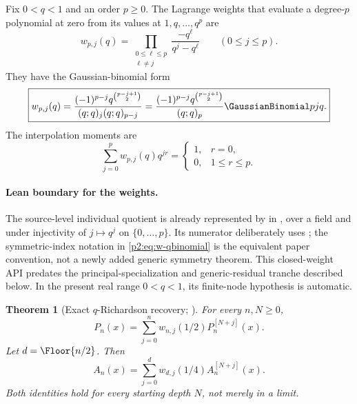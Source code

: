 \documentclass[11pt,oneside]{article}
\numberwithin{equation}{section}
\newtheorem{theorem}{Theorem}[section]
\theoremstyle{definition}
\theoremstyle{remark}
\begin{document}
Fix $0<q<1$ and an order $p\ge0$.  The Lagrange weights that evaluate a degree-$p$ polynomial at
zero from its values at $1,q,\ldots,q^p$ are
\begin{equation}
 w_{p,j}(q)
 =\prod_{\substack{0\le\ell\le p\\\ell\ne j}}
 \frac{-q^\ell}{q^j-q^\ell}
 \qquad(0\le j\le p).
 \label{p2:eq:w-Lagrange}
\end{equation}
They have the Gaussian-binomial form
\begin{equation}
 \boxed{
 w_{p,j}(q)
 =\frac{(-1)^{p-j}q^{\binom{p-j+1}{2}}}
 {(q;q)_j(q;q)_{p-j}}
 =\frac{(-1)^{p-j}q^{\binom{p-j+1}{2}}}{(q;q)_p}
 \GaussianBinomial pj q.
 }
 \label{p2:eq:w-qbinomial}
\end{equation}
The interpolation moments are
\begin{equation}
 \sum_{j=0}^{p}w_{p,j}(q)q^{jr}
 =\begin{cases}
 1,&r=0,\\
 0,&1\le r\le p.
 \end{cases}
 \label{p2:eq:w-annihilation}
\end{equation}

\paragraph{Lean boundary for the weights.}
The source-level individual quotient is already represented by
 in
, over a field and under injectivity of
\(j\mapsto q^j\) on \(\{0,\ldots,p\}\).  Its numerator deliberately uses
; the symmetric-index notation in
\eqref{p2:eq:w-qbinomial} is the equivalent paper convention, not a newly added
generic symmetry theorem.  This closed-weight API predates the
principal-specialization and generic-residual tranche described below.  In the
present real range \(0<q<1\), its finite-node hypothesis is automatic.

\begin{theorem}[Exact $q$-Richardson recovery; \statusnew]
\label{p2:thm:exact-recovery}
For every $n,N\ge0$,
\begin{equation}
 \boxed{
 P_n(x)=\sum_{j=0}^{n}w_{n,j}(1/2)P_n^{[N+j]}(x).
 }
 \label{p2:eq:P-exact-recovery}
\end{equation}
Let $d=\Floor{n/2}$.  Then
\begin{equation}
 \boxed{
 A_n(x)=\sum_{j=0}^{d}w_{d,j}(1/4)A_n^{[N+j]}(x).
 }
 \label{p2:eq:A-exact-recovery}
\end{equation}
Both identities hold for every starting depth $N$, not merely in a limit.
\end{theorem}
\end{document}
